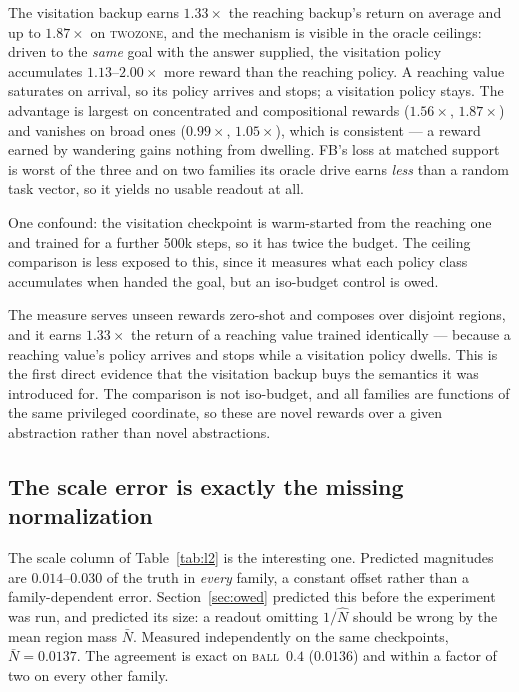 The visitation backup earns $1.33\times$ the reaching backup's return on average
and up to $1.87\times$ on \textsc{twozone}, and the mechanism is visible in the
oracle ceilings: driven to the \emph{same} goal with the answer supplied, the
visitation policy accumulates $1.13$--$2.00\times$ more reward than the reaching
policy. A reaching value saturates on arrival, so its policy arrives and stops; a
visitation policy stays. The advantage is largest on concentrated and
compositional rewards ($1.56\times$, $1.87\times$) and vanishes on broad ones
($0.99\times$, $1.05\times$), which is consistent --- a reward earned by wandering
gains nothing from dwelling. FB's loss at matched support is worst of the three
and on two families its oracle drive earns \emph{less} than a random task vector,
so it yields no usable readout at all.

One confound: the visitation checkpoint is warm-started from the reaching one and
trained for a further 500k steps, so it has twice the budget. The ceiling
comparison is less exposed to this, since it measures what each policy class
accumulates when handed the goal, but an iso-budget control is owed.

\begin{takeaway}
The measure serves unseen rewards zero-shot and composes over disjoint regions,
and it earns $1.33\times$ the return of a reaching value trained identically ---
because a reaching value's policy arrives and stops while a visitation policy
dwells. This is the first direct evidence that the visitation backup buys the
semantics it was introduced for. The comparison is not iso-budget, and all
families are functions of the same privileged coordinate, so these are novel
rewards over a given abstraction rather than novel abstractions.
\end{takeaway}

\subsection{The scale error is exactly the missing normalization}
\label{sec:exp-scale}

The scale column of Table~\ref{tab:l2} is the interesting one. Predicted
magnitudes are $0.014$--$0.030$ of the truth in \emph{every} family, a constant
offset rather than a family-dependent error. Section~\ref{sec:owed} predicted
this before the experiment was run, and predicted its size: a readout omitting
$1/\hat N$ should be wrong by the mean region mass $\bar N$. Measured
independently on the same checkpoints, $\bar N = 0.0137$. The agreement is exact
on \textsc{ball}~$0.4$ ($0.0136$) and within a factor of two on every other
family.

